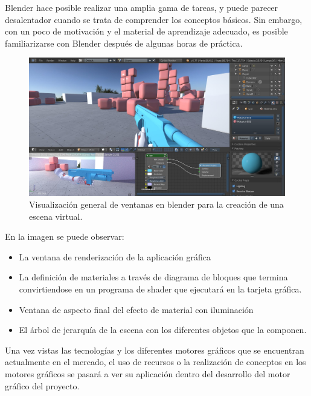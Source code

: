 \documentclass[a4paper, 17pt]{book}
\begin{document}
Blender hace posible realizar una amplia gama de tareas, y puede parecer desalentador cuando se trata de comprender los
conceptos básicos. Sin embargo, con un poco de motivación y el material de aprendizaje adecuado, es posible familiarizarse
con Blender después de algunas horas de práctica.

\begin{figure}[hbt!]
    \centering
    \includegraphics[scale=0.30, keepaspectratio]{img/Blender.jpg}
    \caption{Visualización general de ventanas en blender para la creación de una escena virtual.}
    \label{figura:Blender}
\end{figure}

En la imagen se puede observar: 

\begin{itemize}
  \item La ventana de renderización de la aplicación gráfica

  \item La definición de materiales a través de diagrama de bloques que termina
  convirtiendose en un programa de shader que ejecutará en la tarjeta gráfica.

  \item Ventana de aspecto final del efecto de material con iluminación

  \item El árbol de jerarquía de la escena con los diferentes objetos que la componen.

\end{itemize}

Una vez vistas las tecnologías y los diferentes motores gráficos que se encuentran actualmente en el mercado,
el uso de recursos o la realización de conceptos en los motores gráficos se pasará a ver su aplicación dentro
del desarrollo del motor gráfico del proyecto.
\end{document}
